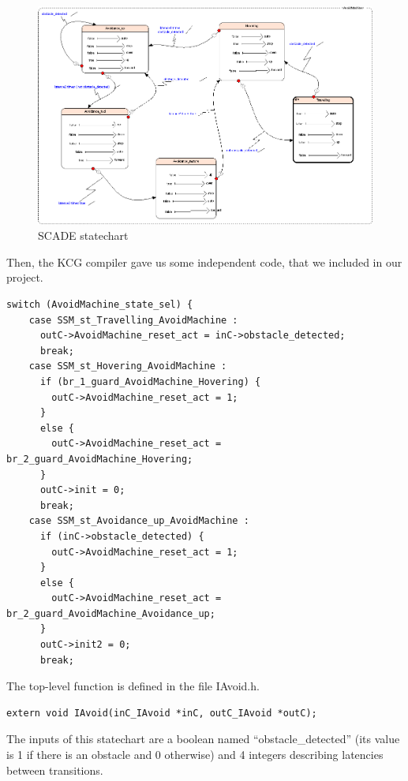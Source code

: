 \begin{figure}[!h] 
\begin{center}

\includegraphics[width=19cm]{imgs/scade.png}
\caption{SCADE statechart} 
\label{img1} 
\end{center}
\end{figure} 

Then, the KCG compiler gave us some independent code, that we included in our project.

\begin{lstlisting}
switch (AvoidMachine_state_sel) {
    case SSM_st_Travelling_AvoidMachine :
      outC->AvoidMachine_reset_act = inC->obstacle_detected;
      break;
    case SSM_st_Hovering_AvoidMachine :
      if (br_1_guard_AvoidMachine_Hovering) {
        outC->AvoidMachine_reset_act = 1;
      }
      else {
        outC->AvoidMachine_reset_act = br_2_guard_AvoidMachine_Hovering;
      }
      outC->init = 0;
      break;
    case SSM_st_Avoidance_up_AvoidMachine :
      if (inC->obstacle_detected) {
        outC->AvoidMachine_reset_act = 1;
      }
      else {
        outC->AvoidMachine_reset_act = br_2_guard_AvoidMachine_Avoidance_up;
      }
      outC->init2 = 0;
      break;
\end{lstlisting}

The top-level function is defined in the file IAvoid.h.

\begin{lstlisting}
extern void IAvoid(inC_IAvoid *inC, outC_IAvoid *outC);
\end{lstlisting}

The inputs of this statechart are a boolean named ``obstacle\_detected'' (its value is 1 if there is an obstacle and 0 otherwise) and 4 integers describing latencies between transitions.\\

